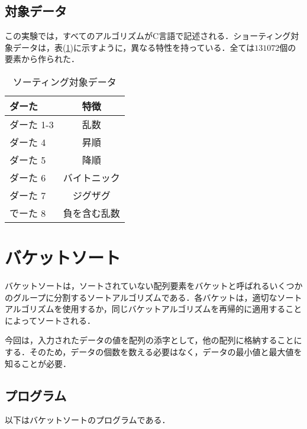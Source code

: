 \documentclass[a4j, titlepage]{jarticle}
\begin{document}
        \subsection{対象データ}
            この実験では，すべてのアルゴリズムがC言語で記述される．ショーティング対象データは，表(\ref{tab:data})に示すように，異なる特性を持っている．全ては$131072$個の要素から作られた．
            \begin{table}[tbh]
                \caption{ソーティング対象データ}
                \label{tab:data}
                \begin{center}
                    \begin{tabular}{lc}
                        \hline
                        ダーた & 特徴 \\ \hline\hline
                        ダーた 1-3 & 乱数\\ 
                        ダーた 4 &  昇順\\ 
                        ダーた 5 &  降順\\ 
                        ダーた 6 &  バイトニック\\ 
                        ダーた 7 &  ジグザグ\\ 
                        でーた 8 & 負を含む乱数\\ \hline
                    \end{tabular}
                \end{center}
            \end{table}

    \section{バケットソート}
        バケットソートは，ソートされていない配列要素をバケットと呼ばれるいくつかのグループに分割するソートアルゴリズムである．各バケットは，適切なソートアルゴリズムを使用するか，同じバケットアルゴリズムを再帰的に適用することによってソートされる．

        今回は，入力されたデータの値を配列の添字として，他の配列に格納することにする．そのため，データの個数を数える必要はなく，データの最小値と最大値を知ることが必要．

        \subsection{プログラム}
            以下はバケットソートのプログラムである．
            
\end{document}
